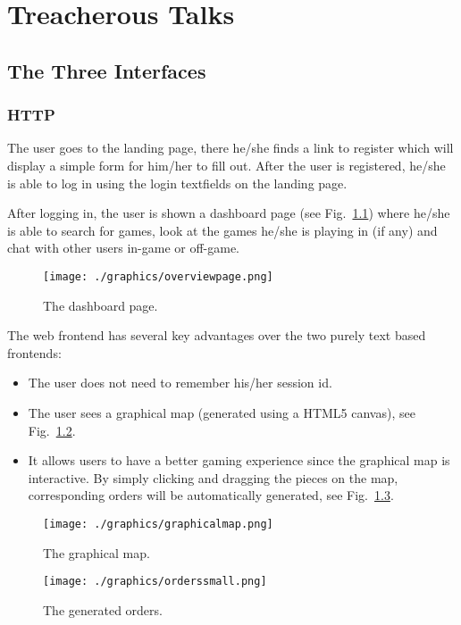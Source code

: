 \documentclass[11pt,a4paper]{report}
\begin{document}
\chapter{Treacherous Talks}
\section{The Three Interfaces}
\subsection{HTTP}
The user goes to the landing page, there he/she finds a link to register which will
display a simple form for him/her to fill out. After the user is registered, he/she is
able to log in using the login textfields on the landing page.

After logging in, the user is shown a dashboard page (see Fig.~\ref{fig:dashboard})
where he/she is able to search for games, look at the games he/she is playing in (if
any) and chat with other users in-game or off-game.

\begin{figure}[h]
 \centering
 \texttt{[image: ./graphics/overviewpage.png]}
 \caption{The dashboard page.}
 \label{fig:dashboard}
\end{figure}

The web frontend has several key advantages over the two purely text based
frontends:
\begin{itemize}
\item The user does not need to remember his/her session id.
\item The user sees a graphical map (generated using a HTML5 canvas),
  see Fig.~\ref{fig:map}.
\item It allows users to have a better gaming experience since the graphical map
is interactive. By simply clicking and dragging the pieces on the map,
corresponding orders will be automatically generated, see Fig.~\ref{fig:orders}.
\end{itemize}

\begin{figure}[h]
 \centering
 \texttt{[image: ./graphics/graphicalmap.png]}
 \caption{The graphical map.}
 \label{fig:map}
\end{figure}

\begin{figure}[h]
 \centering
 \texttt{[image: ./graphics/orderssmall.png]}
 \caption{The generated orders.}
 \label{fig:orders}
\end{figure}
\end{document}
